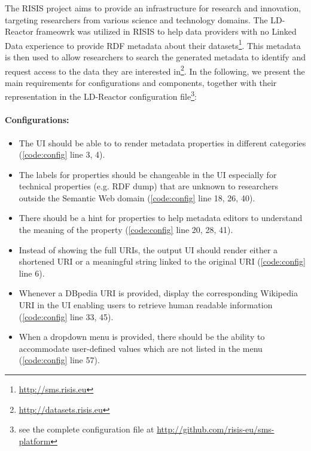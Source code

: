 \documentclass{acm_proc_article-sp}
\begin{document}
The RISIS project aims to provide an infrastructure for research and innovation, targeting researchers from various science and technology domains.
The LD-Reactor frameowrk was utilized in RISIS to help data providers with no Linked Data experience to provide RDF metadata about their datasets\footnote{\url{http://sms.risis.eu}}. This metadata is then used to allow researchers to search the generated metadata to identify and request access to the data they are interested in\footnote{\url{http://datasets.risis.eu}}.
In the following, we present the main requirements for configurations and components, together with their representation in the LD-Reactor configuration file\footnote{see the complete configuration file at \url{http://github.com/risis-eu/sms-platform}}:

\paragraph{Configurations:}
\begin{itemize}
 \item The UI should be able to to render metadata properties in different categories (\autoref{code:config} line 3, 4).
 \item The labels for properties should be changeable in the UI especially for technical properties (e.g. RDF dump) that are unknown to researchers outside the Semantic Web domain (\autoref{code:config} line 18, 26, 40).
 \item There should be a hint for properties to help metadata editors to understand the meaning of the property (\autoref{code:config} line 20, 28, 41).
 \item Instead of showing the full URIs, the output UI should render either a shortened URI or a meaningful string linked to the original URI (\autoref{code:config} line 6). 
 \item Whenever a DBpedia URI is provided, display the corresponding Wikipedia URI in the UI enabling users to retrieve human readable information (\autoref{code:config} line 33, 45).
 \item When a dropdown menu is provided, there should be the ability to accommodate user-defined values which are not listed in the menu (\autoref{code:config} line 57).
 
\end{itemize}
\end{document}
